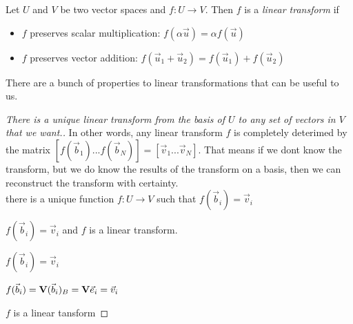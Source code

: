 \begin{definition}
Let $U$ and $V$ be two vector spaces and $f:U \to V$. Then $f$ is a \emph{linear transform} if
\begin{itemize}
    \item $f$ preserves scalar multiplication: $f(\alpha \vec{u}) = \alpha f(\vec{u})$
    \item $f$ preserves vector addition: $f(\vec{u}_1 + \vec{u}_2) = f(\vec{u}_1) + f(\vec{u}_2)$
\end{itemize}
\end{definition}

There are a bunch of properties to linear transformations that can be useful to us. 

\begin{proof}[There is a unique linear transform from the basis of $U$ to any set of vectors in $V$ that we want.] In other words, any linear transform $f$ is completely deterimed by the matrix $[ f(\vec{b}_1) ... f(\vec{b}_N) ] = [\vec{v}_1 ... \vec{v}_N]$. That means if we dont know the transform, but we do know the results of the transform on a basis, then we can reconstruct the transform with certainty.  \\

    { there is a unique function $f:U \to V$ such that $f(\vec{b}_i) = \vec{v}_i$ }{
    
        {$f(\vec{b}_i) = \vec{v}_i$ and $f$ is a linear transform.}{
        
            {$f(\vec{b}_i) = \vec{v}_i$}{
                
                $ f(\vec{b}_i) = \mathbf{V} (\vec{b}_i)_B = \mathbf{V} \vec{e}_i = \vec{v}_i $
                
            }
            
            
            {$f$ is a linear tansform}{
            
            }
        }
    }
\end{proof}

